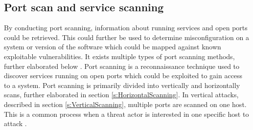 \subsection{Port scan and service scanning}
\label{s:PortScanning}
\label{s:ServiceScan}

By conducting port scanning, information about running services and open ports could be retrieved.
This could further be used to determine misconfiguration on a system or version of the software which could be mapped against known exploitable vulnerabilities. It exists multiple types of port scanning methods, further elaborated below \autocite{pinkard2008nmap}. Port scanning is a reconnaissance technique used to discover services running on open ports which could be exploited to gain access to a system. Port scanning is primarily divided into vertically and horizontally scans, further elaborated in section \ref{s:HorizontalScanning}. In vertical attacks, described in section \ref{s:VerticalScanning}, multiple ports are scanned on one host. This is a common process when a threat actor is interested in one specific host to attack \autocite{dabbagh2011slow}.